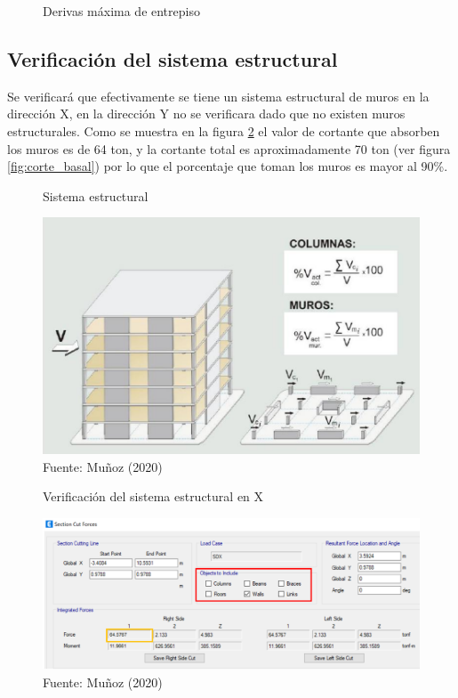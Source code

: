 \documentclass{article}%
\begin{document}
%


\begin{figure}[ht!]%
\caption{Derivas máxima de entrepiso}%
\end{figure}

%
\subsection{Verificación del sistema estructural}%
\label{subsec:Verificacindelsistemaestructural}%
Se verificará que efectivamente se tiene un sistema estructural de muros en la dirección X, en la dirección Y no se verificara dado que no existen muros estructurales. Como se muestra en la figura \ref{fig:sist_est_etabs} el valor de cortante que absorben los muros es de 64 ton, y la cortante total es aproximadamente 70 ton (ver figura \ref{fig:corte_basal}) por lo que el porcentaje que toman los muros es mayor al 90\%.\\%


\begin{figure}[ht!]%
\centering%
\caption{Sistema estructural}%
\includegraphics[scale=0.7]{images/sist_estructural.PNG}%
\caption*{\small Fuente: Muñoz (2020)}%
\label{fig:sist_est}%
\end{figure}

%


\begin{figure}[ht!]%
\centering%
\caption{Verificación del sistema estructural en X}%
\includegraphics[scale=0.7]{images/sist_estructural_etabs.PNG}%
\caption*{\small Fuente: Muñoz (2020)}%
\label{fig:sist_est_etabs}%
\end{figure}
\end{document}
